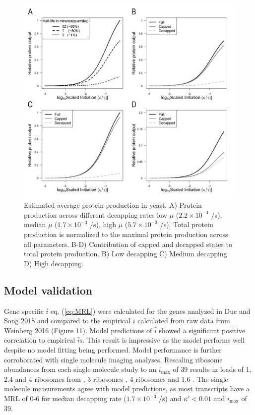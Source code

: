 \documentclass[a4,center,fleqn]{NAR}
\newcommand{\imax}{\ensuremath{{i_{\max}}}\xspace}
\newcommand{\MRL}{\ensuremath{\bar{i}}\xspace}
\newcommand{\MRLs}{\ensuremath{\bar{i}\text{s}}\xspace}
\begin{document}
\begin{figure}[!ht]
\begin{center}
\includegraphics[width = 120mm]{Images/2023-07-17_Protein_Production_v2.png}
\caption{Estimated average protein production in yeast.  A) Protein production across different decapping rates  low $\mu$ ($2.2\times 10^{-4}$ /s), median $\mu$ ($1.7\times 10^{-3}$ /s), high $\mu$ ($5.7\times 10^{-3}$ /s). Total protein production is normalized to the maximal protein production across all parameters. B-D) Contribution of capped and decapped states to total protein production. B) Low decapping C) Medium decapping D) High decapping. }
\end{center}
\end{figure}


\subsection{Model validation}

Gene specific \MRL eq. (\ref{eq:MRL}) were calculated for the genes analyzed in Duc and Song 2018 and compared to the empirical \MRL calculated from raw data from Weinberg 2016 (Figure 11).
Model predictions of \MRL showed a significant positive correlation to empirical \MRLs.
This result is impressive as the model performs well despite no model fitting being performed.
Model performance is further corroborated with single molecule imaging analyses.
Rescaling ribosome abundances from each single molecule study to an \imax of 39 results in loads of 1, 2.4 and 4 ribosomes from \citep{RN30}, 3 ribosomes \citep{RN31}, 4 ribosomes \citep{RN32} and 1.6 \citep{RN33}.
The single molecule measurements agree with model predictions, as most transcripts have a MRL of 0-6 for median decapping rate ($1.7\times 10^{-3}$ /s) and  $\kappa' < 0.01$ and \imax of 39.
\end{document}
